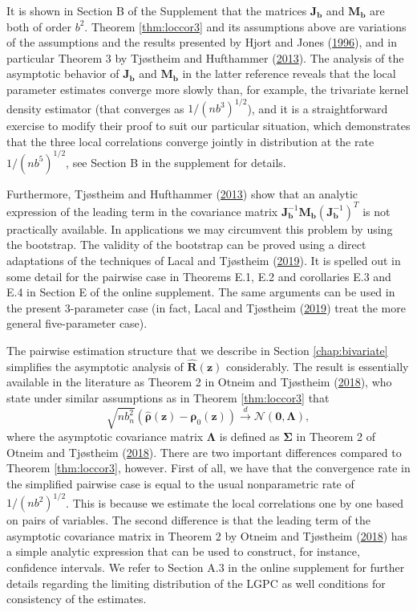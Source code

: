 \documentclass[
  12pt,
  letterpaper]{article}
\newcommand{\z}{\bm{z}}
\newcommand{\hR}{\widehat{\bm{R}}}
\newcommand{\frho}{\bm{\rho}}
\newcommand{\hfrho}{\widehat{\bm{\rho}}}
\newcommand{\hh}{\bm{b}}
\newcommand{\fSigma}{\bm{\Sigma}}
\newcommand{\fLambda}{\bm{\Lambda}}
\newcommand{\Jb}{\bm{J}_{\hh}}
\newcommand{\Mb}{\bm{M}_{\hh}}
\theoremstyle{definition}
\theoremstyle{definition}
\theoremstyle{definition}
\theoremstyle{remark}
\begin{document}
It is shown in Section B of the Supplement that the matrices \(\Jb\) and \(\Mb\) are both of order \(b^2\). Theorem \ref{thm:loccor3} and its assumptions above are variations of the assumptions and the results presented by Hjort and Jones (\protect\hyperlink{ref-hjort1996locally}{1996}), and in particular Theorem 3 by Tjøstheim and Hufthammer (\protect\hyperlink{ref-tjostheim2013local}{2013}). The analysis of the asymptotic behavior of \(\Jb\) and \(\Mb\) in the latter reference reveals that the local parameter estimates converge more slowly than, for example, the trivariate kernel density estimator (that converges as \(1/(nb^3)^{1/2}\)), and it is a straightforward exercise to modify their proof to suit our particular situation, which demonstrates that the three local correlations converge jointly in distribution at the rate \(1/(nb^5)^{1/2}\), see Section B in the supplement for details.

Furthermore, Tjøstheim and Hufthammer (\protect\hyperlink{ref-tjostheim2013local}{2013}) show that an analytic expression of the leading term in the covariance matrix \(\Jb^{-1}\Mb(\Jb^{-1})^T\) is not practically available. In applications we may circumvent this problem by using the bootstrap. The validity of the bootstrap can be proved using a direct adaptations of the techniques of Lacal and Tjøstheim (\protect\hyperlink{ref-lacal2018estimating}{2019}). It is spelled out in some detail for the pairwise case in Theorems E.1, E.2 and corollaries E.3 and E.4 in Section E of the online supplement. The same arguments can be used in the present 3-parameter case (in fact, Lacal and Tjøstheim (\protect\hyperlink{ref-lacal2018estimating}{2019}) treat the more general five-parameter case).

The pairwise estimation structure that we describe in Section \ref{chap:bivariate} simplifies the asymptotic analysis of \(\hR(\z)\) considerably. The result is essentially available in the literature as Theorem 2 in Otneim and Tjøstheim (\protect\hyperlink{ref-otneim2017conditional}{2018}), who state under similar assumptions as in Theorem \ref{thm:loccor3} that
\begin{equation}
\sqrt{nb_n^2}\left(\hfrho(\z) - \frho_0(\z)\right) \stackrel{d}{\rightarrow} \mathcal{N}(\bm{0}, \fLambda),
\label{eq:ot2018}
\end{equation}
where the asymptotic covariance matrix \(\fLambda\) is defined as \(\fSigma\) in Theorem 2 of Otneim and Tjøstheim (\protect\hyperlink{ref-otneim2017conditional}{2018}). There are two important differences compared to Theorem \ref{thm:loccor3}, however. First of all, we have that the convergence rate in the simplified pairwise case is equal to the usual nonparametric rate of \(1/(nb^2)^{1/2}\). This is because we estimate the local correlations one by one based on pairs of variables. The second difference is that the leading term of the asymptotic covariance matrix in Theorem 2 by Otneim and Tjøstheim (\protect\hyperlink{ref-otneim2017conditional}{2018}) has a simple analytic expression that can be used to construct, for instance, confidence intervals. We refer to Section A.3 in the online supplement for further details regarding the limiting distribution of the LGPC as well conditions for consistency of the estimates.
\end{document}
